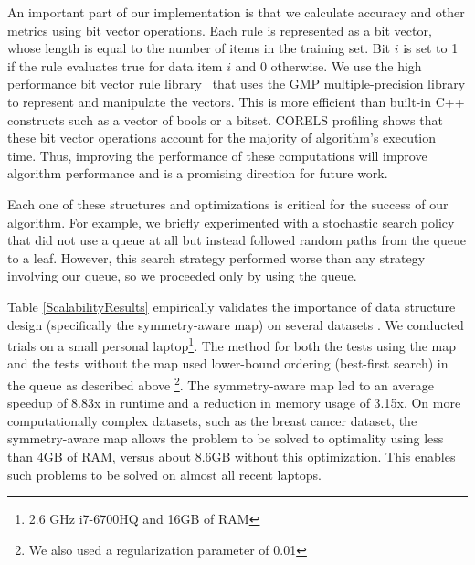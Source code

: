 \documentclass[format=sigconf]{acmart}
\begin{document}
An important part of our implementation is that we calculate accuracy and other metrics using bit vector operations.
Each rule is represented as a bit vector, whose length is equal to the number of items in the training set. 
Bit $i$ is set to 1 if the rule evaluates true for data item $i$ and 0 otherwise.
We use the high performance bit vector rule library~\cite{YangRuSe16}
that uses the GMP multiple-precision library to represent and manipulate the vectors.
This is more efficient than built-in C++ constructs such as a vector of bools or a bitset.
CORELS profiling shows that these bit vector operations account for
the majority of algorithm's execution time.
Thus, improving the performance of these computations will improve algorithm performance and is a promising direction for future work.


Each one of these structures and optimizations is critical for the success of our algorithm.
For example, we briefly experimented with a stochastic search policy that did not use a queue at all but instead followed random paths from the queue to a leaf.
However, this search strategy performed worse than any strategy involving our queue, so we proceeded only by using the queue.

Table \ref{ScalabilityResults} empirically validates the importance of data structure design (specifically the symmetry-aware map) on several datasets \cite{UCI, Bcancer, nyclu:2014}.
We conducted trials on a small personal laptop\footnote{2.6 GHz i7-6700HQ and 16GB of RAM}.
The method for both the tests using the map and the tests without the map used lower-bound ordering (best-first search) in the queue as described above \footnote{We also used a regularization parameter of 0.01}.
The symmetry-aware map led to an average speedup of 8.83x in runtime and a reduction in memory usage of 3.15x.
On more computationally complex datasets, such as the breast cancer dataset, the symmetry-aware map allows the problem to be solved to optimality using less than 4GB of RAM, versus about 8.6GB without this optimization.
This enables such problems to be solved on almost all recent laptops.
\end{document}
